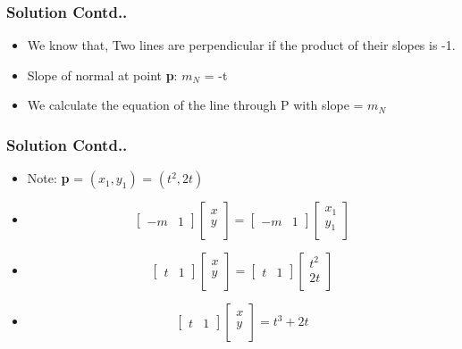 \documentclass[12pt]{beamer}
\begin{document}

\begin{frame}
\frametitle{Solution Contd..}
\begin{itemize}
\item<1-3> We know that, Two lines are perpendicular if the product of their slopes is -1.
\item<2-3> Slope of normal at point \textbf{p}: $m_N$ = -t
\item<3> We calculate the equation of the line through P with slope = $m_N$
\end{itemize}
\end{frame}


\begin{frame}
\frametitle{Solution Contd..}
\begin{itemize}
\item<1-4> Note: \textbf{p} = $( x_1, y_1 )$ = $( t^2, 2t )$
\item<2-4>
\[
\begin{bmatrix}
    -m & 1  
\end{bmatrix}
\begin{bmatrix}
    x\\
    y\\  
\end{bmatrix} = 
\begin{bmatrix}
    -m & 1  
\end{bmatrix}
\begin{bmatrix}
    x_1\\
    y_1\\  
\end{bmatrix}
\]
\item<3-4>
\[
\begin{bmatrix}
    t & 1  
\end{bmatrix}
\begin{bmatrix}
    x\\
    y\\  
\end{bmatrix} = 
\begin{bmatrix}
    t & 1  
\end{bmatrix}
\begin{bmatrix}
    t^2\\
    2t\\  
\end{bmatrix}
\]
\item<4> \[
\begin{bmatrix}
    t & 1  
\end{bmatrix}
\begin{bmatrix}
    x\\
    y\\  
\end{bmatrix} = 
t^3 + 2t
\]
\end{itemize}
\end{frame}
\end{document}
